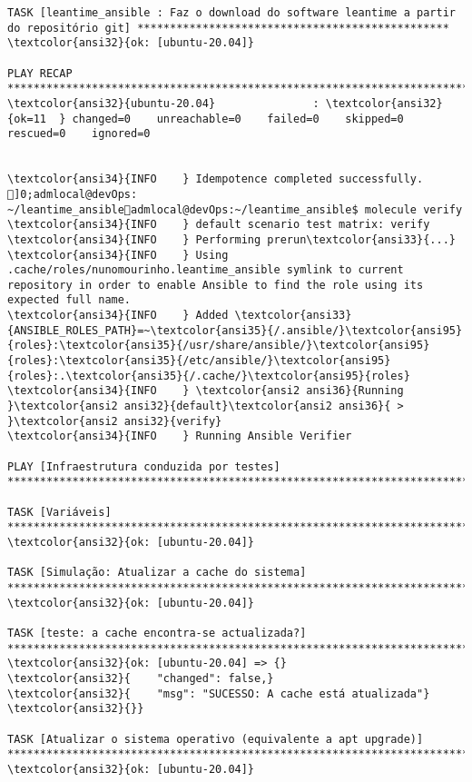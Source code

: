 \documentclass{scrartcl}
\begin{document}
\begin{Verbatim}
TASK [leantime_ansible : Faz o download do software leantime a partir do repositório git] ************************************************
\textcolor{ansi32}{ok: [ubuntu-20.04]}

PLAY RECAP *******************************************************************************************************************************
\textcolor{ansi32}{ubuntu-20.04}               : \textcolor{ansi32}{ok=11  } changed=0    unreachable=0    failed=0    skipped=0    rescued=0    ignored=0


\textcolor{ansi34}{INFO    } Idempotence completed successfully.
]0;admlocal@devOps: ~/leantime_ansibleadmlocal@devOps:~/leantime_ansible$ molecule verify
\textcolor{ansi34}{INFO    } default scenario test matrix: verify
\textcolor{ansi34}{INFO    } Performing prerun\textcolor{ansi33}{...}
\textcolor{ansi34}{INFO    } Using .cache/roles/nunomourinho.leantime_ansible symlink to current repository in order to enable Ansible to find the role using its expected full name.
\textcolor{ansi34}{INFO    } Added \textcolor{ansi33}{ANSIBLE_ROLES_PATH}=~\textcolor{ansi35}{/.ansible/}\textcolor{ansi95}{roles}:\textcolor{ansi35}{/usr/share/ansible/}\textcolor{ansi95}{roles}:\textcolor{ansi35}{/etc/ansible/}\textcolor{ansi95}{roles}:.\textcolor{ansi35}{/.cache/}\textcolor{ansi95}{roles}
\textcolor{ansi34}{INFO    } \textcolor{ansi2 ansi36}{Running }\textcolor{ansi2 ansi32}{default}\textcolor{ansi2 ansi36}{ > }\textcolor{ansi2 ansi32}{verify}
\textcolor{ansi34}{INFO    } Running Ansible Verifier

PLAY [Infraestrutura conduzida por testes] ***********************************************************************************************

TASK [Variáveis] *************************************************************************************************************************
\textcolor{ansi32}{ok: [ubuntu-20.04]}

TASK [Simulação: Atualizar a cache do sistema] *******************************************************************************************
\textcolor{ansi32}{ok: [ubuntu-20.04]}

TASK [teste: a cache encontra-se actualizada?] *******************************************************************************************
\textcolor{ansi32}{ok: [ubuntu-20.04] => {}
\textcolor{ansi32}{    "changed": false,}
\textcolor{ansi32}{    "msg": "SUCESSO: A cache está atualizada"}
\textcolor{ansi32}{}}

TASK [Atualizar o sistema operativo (equivalente a apt upgrade)] *************************************************************************
\textcolor{ansi32}{ok: [ubuntu-20.04]}


\end{Verbatim}
\end{document}
